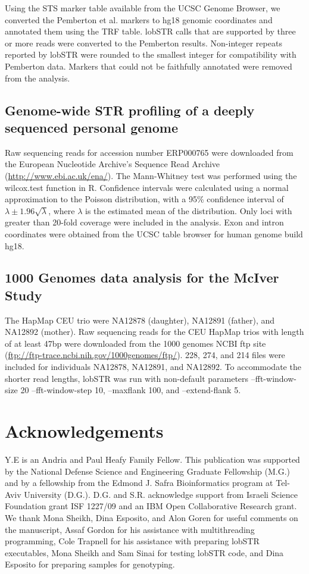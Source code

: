 Using the STS marker table available from the UCSC Genome Browser, we converted the Pemberton et al. markers to hg18 genomic coordinates and annotated them using the TRF table. lobSTR calls that are supported by three or more reads were converted to the Pemberton results. Non-integer repeats reported by lobSTR were rounded to the smallest integer for compatibility with Pemberton data. Markers that could not be faithfully annotated were removed from the analysis.

\subsection{Genome-wide STR profiling of a deeply sequenced personal genome}
Raw sequencing reads for accession number ERP000765 were downloaded from the European Nucleotide Archive’s Sequence Read Archive (\url{http://www.ebi.ac.uk/ena/}). The Mann-Whitney test was performed using the wilcox.test function in R. Confidence intervals were calculated using a normal approximation to the Poisson distribution, with a 95\% confidence interval of $\lambda\pm 1.96\sqrt{\lambda}$, where $\lambda$ is the estimated mean of the distribution. Only loci with greater than 20-fold coverage were included in the analysis. Exon and intron coordinates were obtained from the UCSC table browser for human genome build hg18. 

\subsection{1000 Genomes data analysis for the McIver Study}
The HapMap CEU trio were NA12878 (daughter), NA12891 (father), and NA12892 (mother). Raw sequencing reads for the CEU HapMap trios with length of at least 47bp were downloaded from the 1000 genomes NCBI ftp site (\url{ftp://ftp-trace.ncbi.nih.gov/1000genomes/ftp/}). 228, 274, and 214 files were included for individuals NA12878, NA12891, and NA12892. To accommodate the shorter read lengths, lobSTR was run with non-default parameters –fft-window-size 20 –fft-window-step 10, --maxflank 100, and –extend-flank 5. 

\section{Acknowledgements}
Y.E is an Andria and Paul Heafy Family Fellow. This publication was supported by the National Defense Science and Engineering Graduate Fellowship (M.G.) and by a fellowship from the Edmond J. Safra Bioinformatics program at Tel-Aviv University (D.G.). D.G. and S.R. acknowledge support from Israeli Science Foundation grant ISF 1227/09 and an IBM Open Collaborative Research grant. We thank Mona Sheikh, Dina Esposito, and Alon Goren for useful comments on the manuscript, Assaf Gordon for his assistance with multithreading programming, Cole Trapnell for his assistance with preparing lobSTR executables, Mona Sheikh and Sam Sinai for testing lobSTR code, and Dina Esposito for preparing samples for genotyping. 

